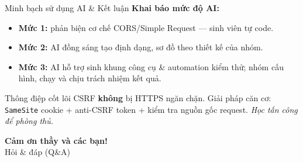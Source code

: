 \documentclass[11pt,aspectratio=169]{beamer}
\begin{document}
\begin{frame}{Minh bạch sử dụng AI \& Kết luận}
  \textbf{Khai báo mức độ AI:}
  \begin{itemize}\small
    \item \textbf{Mức 1:} phản biện cơ chế CORS/Simple Request — sinh viên tự code.
    \item \textbf{Mức 2:} AI đồng sáng tạo định dạng, sơ đồ theo thiết kế của nhóm.
    \item \textbf{Mức 3:} AI hỗ trợ sinh khung công cụ \& automation kiểm thử; nhóm cấu hình, chạy và chịu trách nhiệm kết quả.
  \end{itemize}
  \vfill
  \begin{alertblock}{Thông điệp cốt lõi}
    \small CSRF \textbf{không} bị HTTPS ngăn chặn. Giải pháp căn cơ: \texttt{SameSite} cookie + anti-CSRF token + kiểm tra nguồn gốc request. \textit{Học tấn công để phòng thủ.}
  \end{alertblock}
\end{frame}

{
\begin{frame}[plain]
  \centering\vfill
  {\color{white}\Huge\textbf{Cảm ơn thầy và các bạn!}}\\[10pt]
  {\color{mist}\large Hỏi \& đáp (Q\&A)}
  \vfill
\end{frame}}
\end{document}
